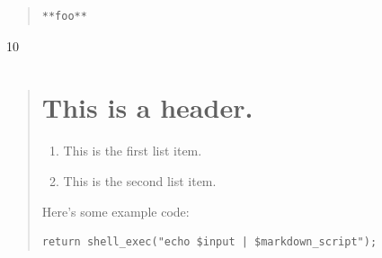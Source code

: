 \begin{quote}
\end{quote}

\begin{quote}
\begin{verbatim}
**foo**
\end{verbatim}
\end{quote}

10

\begin{quote}
\chapter{This is a header.}
\label{thisisaheader.}

\begin{enumerate}
\item This is the first list item.
\item This is the second list item.
\end{enumerate}

Here's some example code:

\begin{verbatim}
return shell_exec("echo $input | $markdown_script");
\end{verbatim}
\end{quote}



